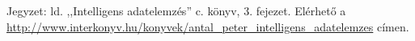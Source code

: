 
Jegyzet: ld. ,,Intelligens adatelemzés'' c. könyv, 3. fejezet. Elérhető a \url{http://www.interkonyv.hu/konyvek/antal_peter_intelligens_adatelemzes} címen.
